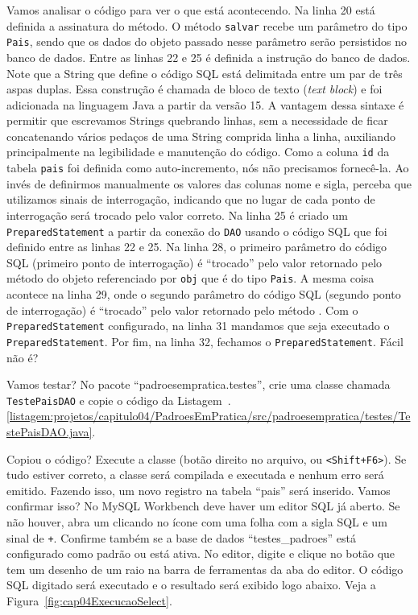 Vamos analisar o código para ver o que está acontecendo. Na linha 20 está definida a assinatura do método. O método \texttt{salvar} recebe um parâmetro do tipo \texttt{Pais}, sendo que os dados do objeto passado nesse parâmetro serão persistidos no banco de dados. Entre as linhas 22 e 25 é definida a instrução  do banco de dados. Note que a String que define o código SQL está delimitada entre um par de três aspas duplas. Essa construção é chamada de bloco de texto (\textit{text block}) e foi adicionada na linguagem Java a partir da versão 15. A vantagem dessa sintaxe é permitir que escrevamos Strings quebrando linhas, sem a necessidade de ficar concatenando vários pedaços de uma String comprida linha a linha, auxiliando principalmente na legibilidade e manutenção do código. Como a coluna \texttt{id} da tabela \texttt{pais} foi definida como auto-incremento, nós não precisamos fornecê-la. Ao invés de definirmos manualmente os valores das colunas nome e sigla, perceba que utilizamos sinais de interrogação, indicando que no lugar de cada ponto de interrogação será trocado pelo valor correto. Na linha 25 é criado um \texttt{PreparedStatement} a partir da conexão do \texttt{DAO} usando o código SQL que foi definido entre as linhas 22 e 25. Na linha 28, o primeiro parâmetro do código SQL (primeiro ponto de interrogação) é ``trocado'' pelo valor retornado pelo método  do objeto referenciado por \texttt{obj} que é do tipo \texttt{Pais}. A mesma coisa acontece na linha 29, onde o segundo parâmetro do código SQL (segundo ponto de interrogação) é ``trocado'' pelo valor retornado pelo método . Com o \texttt{PreparedStatement} configurado, na linha 31 mandamos que seja executado o \texttt{PreparedStatement}. Por fim, na linha 32, fechamos o \texttt{PreparedStatement}. Fácil não é?

Vamos testar? No pacote ``padroesempratica.testes'', crie uma classe chamada \texttt{TestePaisDAO} e copie o código da Listagem~\thechapter.\ref{listagem:projetos/capitulo04/PadroesEmPratica/src/padroesempratica/testes/TestePaisDAO.java}.


Copiou o código? Execute a classe (botão direito no arquivo,  ou \texttt{<Shift+F6>}). Se tudo estiver correto, a classe será compilada e executada e nenhum erro será emitido. Fazendo isso, um novo registro na tabela ``pais'' será inserido. Vamos confirmar isso? No MySQL Workbench deve haver um editor SQL já aberto. Se não houver, abra um clicando no ícone com uma folha com a sigla SQL e um sinal de \texttt{+}. Confirme também se a base de dados ``testes\_padroes'' está configurado como padrão ou está ativa. No editor, digite  e clique no botão que tem um desenho de um raio na barra de ferramentas da aba do editor. O código SQL digitado será executado e o resultado será exibido logo abaixo. Veja a Figura~\ref{fig:cap04ExecucaoSelect}.

